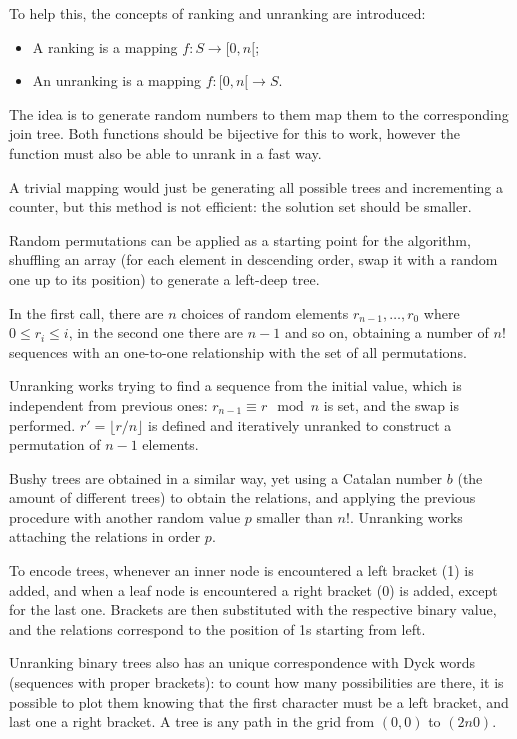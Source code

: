To help this, the concepts of ranking and unranking are introduced:
\begin{itemize}
	\item A ranking is a mapping $f : S \rightarrow [0, n[$;
	\item An unranking is a mapping $f : [0, n[ \rightarrow S$.
\end{itemize}
The idea is to generate random numbers to them map them to the corresponding join tree. Both functions should be bijective for this to work, however the function must also be able to unrank in a fast way.

A trivial mapping would just be generating all possible trees and incrementing a counter, but this method is not efficient: the solution set should be smaller.

Random permutations can be applied as a starting point for the algorithm, shuffling an array (for each element in descending order, swap it with a random one up to its position) to generate a left-deep tree. 

In the first call, there are $n$ choices of random elements $r_{n-1}, \dots, r_0$ where $0 \leq r_i \leq i$, in the second one there are $n - 1$ and so on, obtaining a number of $n!$ sequences with an one-to-one relationship with the set of all permutations.

Unranking works trying to find a sequence from the initial value, which is independent from previous ones: $r_{n-1} \equiv r \mod n$ is set, and the swap is performed. $r' = \lfloor r/n\rfloor$ is defined and iteratively unranked to construct a permutation of $n - 1$ elements. 

Bushy trees are obtained in a similar way, yet using a Catalan number $b$ (the amount of different trees) to obtain the relations, and applying the previous procedure with another random value $p$ smaller than $n!$. Unranking works attaching the relations in order $p$.

To encode trees, whenever an inner node is encountered a left bracket (1) is added, and when a leaf node is encountered a right bracket (0) is added, except for the last one. Brackets are then substituted with the respective binary value, and the relations correspond to the position of 1s starting from left. 

Unranking binary trees also has an unique correspondence with Dyck words (sequences with proper brackets): to count how many possibilities are there, it is possible to plot them knowing that the first character must be a left bracket, and last one a right bracket. A tree is any path in the grid from $(0, 0)$ to $(2n 0)$.


